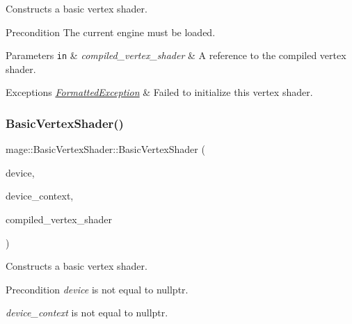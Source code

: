 Constructs a basic vertex shader.

\begin{DoxyPrecond}{Precondition}
The current engine must be loaded. 
\end{DoxyPrecond}

\begin{DoxyParams}[1]{Parameters}
\mbox{\tt in}  & {\em compiled\+\_\+vertex\+\_\+shader} & A reference to the compiled vertex shader. \\
\hline
\end{DoxyParams}

\begin{DoxyExceptions}{Exceptions}
{\em \hyperlink{structmage_1_1_formatted_exception}{Formatted\+Exception}} & Failed to initialize this vertex shader. \\
\hline
\end{DoxyExceptions}
\hypertarget{classmage_1_1_basic_vertex_shader_a9cd9b21663a009c1ca37c35ab6ac7298}{}\label{classmage_1_1_basic_vertex_shader_a9cd9b21663a009c1ca37c35ab6ac7298} 
\subsubsection{\texorpdfstring{Basic\+Vertex\+Shader()}{BasicVertexShader()}\hspace{0.1cm}{\footnotesize\ttfamily [4/6]}}
{\footnotesize\ttfamily mage\+::\+Basic\+Vertex\+Shader\+::\+Basic\+Vertex\+Shader (\begin{DoxyParamCaption}\item[{I\+D3\+D11\+Device2 $\ast$}]{device,  }\item[{I\+D3\+D11\+Device\+Context2 $\ast$}]{device\+\_\+context,  }\item[{const \hyperlink{structmage_1_1_compiled_vertex_shader}{Compiled\+Vertex\+Shader} \&}]{compiled\+\_\+vertex\+\_\+shader }\end{DoxyParamCaption})\hspace{0.3cm}{\ttfamily [explicit]}}

Constructs a basic vertex shader.

\begin{DoxyPrecond}{Precondition}
{\itshape device} is not equal to {\ttfamily nullptr}. 

{\itshape device\+\_\+context} is not equal to {\ttfamily nullptr}. 
\end{DoxyPrecond}

